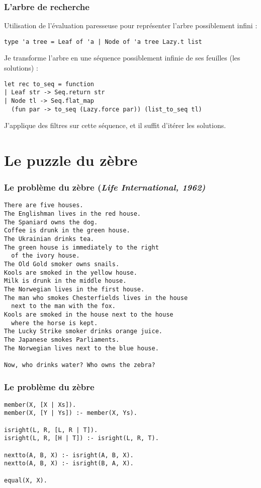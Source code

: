 \documentclass[aspectratio=43]{beamer}
\begin{document}
\begin{frame}[fragile]
  \frametitle{L'arbre de recherche}
  Utilisation de l'évaluation paresseuse pour représenter l'arbre possiblement infini :
  \begin{verbatim}
type 'a tree = Leaf of 'a | Node of 'a tree Lazy.t list
  \end{verbatim}

  \vspace{1em}
  
  Je transforme l'arbre en une séquence possiblement infinie de ses feuilles (les solutions) :
  
  \begin{verbatim}
let rec to_seq = function
| Leaf str -> Seq.return str
| Node tl -> Seq.flat_map
  (fun par -> to_seq (Lazy.force par)) (list_to_seq tl)
  \end{verbatim}

  \vspace{1em}
  J'applique des filtres sur cette séquence, et il suffit d'itérer les solutions.
\end{frame}

\section{Le puzzle du zèbre}

\begin{frame}[fragile]
  \frametitle{Le problème du zèbre (\textit{Life International, 1962)}}
  \begin{verbatim}
There are five houses.
The Englishman lives in the red house.
The Spaniard owns the dog.
Coffee is drunk in the green house.
The Ukrainian drinks tea.
The green house is immediately to the right
  of the ivory house.
The Old Gold smoker owns snails.
Kools are smoked in the yellow house.
Milk is drunk in the middle house.
The Norwegian lives in the first house.
The man who smokes Chesterfields lives in the house
  next to the man with the fox.
Kools are smoked in the house next to the house
  where the horse is kept.
The Lucky Strike smoker drinks orange juice.
The Japanese smokes Parliaments.
The Norwegian lives next to the blue house.

Now, who drinks water? Who owns the zebra?
  \end{verbatim}
\end{frame}


\begin{frame}[fragile]
  \frametitle{Le problème du zèbre}
  \begin{verbatim}
member(X, [X | Xs]).
member(X, [Y | Ys]) :- member(X, Ys).

isright(L, R, [L, R | T]).
isright(L, R, [H | T]) :- isright(L, R, T).

nextto(A, B, X) :- isright(A, B, X).
nextto(A, B, X) :- isright(B, A, X).

equal(X, X).
  \end{verbatim}
\end{frame}
\end{document}
